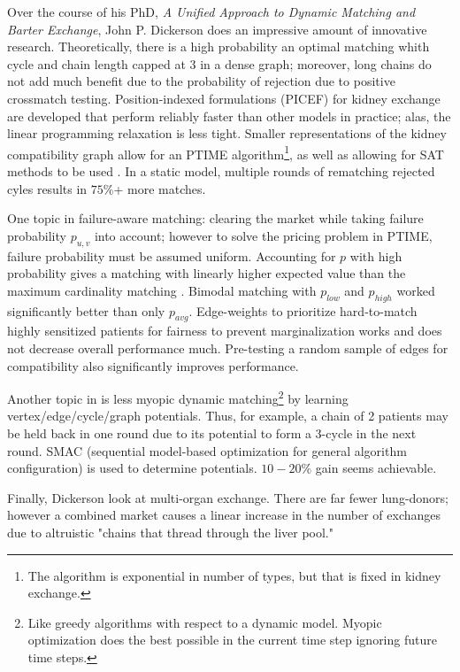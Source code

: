 \documentclass[main.tex]{subfiles}
\begin{document}
Over the course of his PhD, \textit{A Unified Approach to Dynamic Matching and Barter Exchange}, John P. Dickerson \cite{Dick} does an impressive amount of innovative research. Theoretically, there is a high probability an optimal matching whith cycle and chain length capped at 3 in a dense graph; moreover, long chains do not add much benefit due to the probability of rejection due to positive crossmatch testing. Position-indexed formulations (PICEF) for kidney exchange \cite{Dick} \cite{Dick1} are developed that perform reliably faster than other models in practice; alas, the linear programming relaxation is less tight. Smaller representations of the kidney compatibility graph allow for an PTIME algorithm\footnote{The algorithm is exponential in number of types, but that is fixed in kidney exchange.}, as well as allowing for SAT methods to be used \cite{Dick} \cite{Dick2}. In a static model, multiple rounds of rematching rejected cyles results in $75\%$+ more matches.

One topic in \cite{Dick} failure-aware matching: clearing the market while taking failure probability $p_{u,v}$ into account; however to solve the pricing problem in PTIME, failure probability must be assumed uniform. Accounting for $p$ with high probability gives a matching with linearly higher expected value than the maximum cardinality matching \cite{Dick} \cite{Dick3}. Bimodal matching with $p_{low}$ and $p_{high}$ worked significantly better than only $p_{avg}$. Edge-weights to prioritize hard-to-match highly sensitized patients for fairness to prevent marginalization works and does not decrease overall performance much. Pre-testing a random sample of edges for compatibility also significantly improves performance.

Another topic in \cite{Dick} is less myopic dynamic matching\footnote{Like greedy algorithms with respect to a dynamic model. Myopic optimization does the best possible in the current time step ignoring future time steps.} by learning vertex/edge/cycle/graph potentials. Thus, for example, a chain of 2 patients may be held back in one round due to its potential to form a 3-cycle in the next round. SMAC (sequential model-based optimization for general algorithm configuration) \cite{Hut1} is used to determine potentials. $10-20\%$ gain seems achievable.

Finally, Dickerson \cite{Dick} \cite{Dick4} look at multi-organ exchange. There are far fewer lung-donors; however a combined market causes a linear increase in the number of exchanges due to altruistic "chains that thread through the liver pool."
\end{document}

